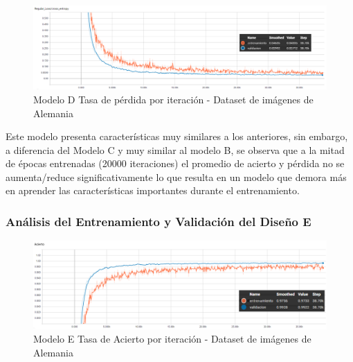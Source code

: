 			\begin{figure}[H]
				\begin{center}
				\includegraphics[width=1\textwidth]{images/desarrollo/trainResults/german/model6Loss_1} 
				\end{center}
				\begin{center}
				\caption{\small{Modelo D Tasa de pérdida por iteración - Dataset de imágenes de Alemania}}
				
				{\small{\fontsize{10}{16.8}\selectfont {Fuente: Elaboración propia}}}
				\end{center}
				\vspace{-1.5em}
			\end{figure}

			Este modelo presenta características muy similares a los anteriores, sin embargo, a diferencia del Modelo C y muy similar al modelo B, se observa que a la mitad de épocas entrenadas (20000 iteraciones) el promedio de acierto y pérdida no se aumenta/reduce significativamente lo que resulta en un modelo que demora más en aprender las características importantes durante el entrenamiento.
			

		\subsubsection{Análisis del Entrenamiento y Validación del Diseño E} 
			\begin{figure}[H]
				\begin{center}
				\includegraphics[width=1\textwidth]{images/desarrollo/trainResults/german/model7Acierto} 
				\end{center}
				\begin{center}
				\caption{\small{Modelo E Tasa de Acierto por iteración - Dataset de imágenes de Alemania  }}
				
				{\small{\fontsize{10}{16.8}\selectfont {Fuente: Elaboración propia}}}
				\end{center}
				\vspace{-1.5em}
			\end{figure}
		
